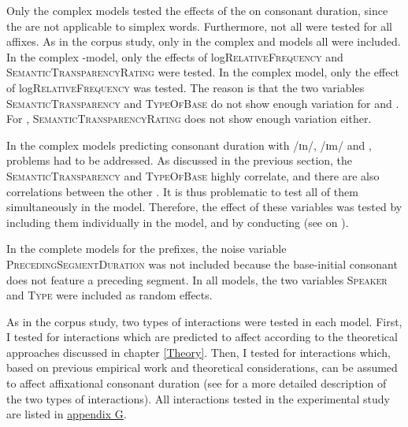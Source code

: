 Only the complex models tested the effects of the  on consonant duration, since the  are not applicable to simplex words.
Furthermore, not all  were tested for all affixes. As in the corpus study, only in the complex   and models all  were included. In the complex -model, only the effects of log\textsc{RelativeFrequency} and \textsc{SemanticTransparencyRating} were tested. In the complex model, only the effect of log\textsc{RelativeFrequency} was tested. The reason is that the two variables  \textsc{SemanticTransparency} and \textsc{TypeOfBase} do not show enough variation for  and . For , \textsc{SemanticTransparencyRating} does not show enough variation either.


In the complex models predicting consonant duration with /ɪn/, /ɪm/ and ,  problems had to be addressed. As discussed in the previous section, the  \textsc{SemanticTransparency} and \textsc{TypeOfBase} highly correlate, and there are also correlations between the other . It is thus problematic to test all of them simultaneously in the model. Therefore, the effect of these variables was tested by including them individually in the model, and by conducting  (see  on ). 

In the complete models for the prefixes, the noise variable \textsc{PrecedingSegmentDuration} was not included because the base-initial consonant does not feature a preceding segment. In all models, the two variables \textsc{Speaker} and \textsc{Type} were included as random effects.


As in the corpus study, two types of interactions were tested in each model. First, I tested for interactions which are predicted to affect  according to the theoretical approaches discussed in chapter \ref{Theory}. Then, I tested for interactions which, based on previous empirical work and theoretical considerations, can be assumed to affect affixational consonant duration  (see  for a more detailed description of the two types of interactions). 
 All interactions tested in the experimental study are listed in \hyperref[Appendix G Summaries of tested interactions in experimental study]{appendix G}.


